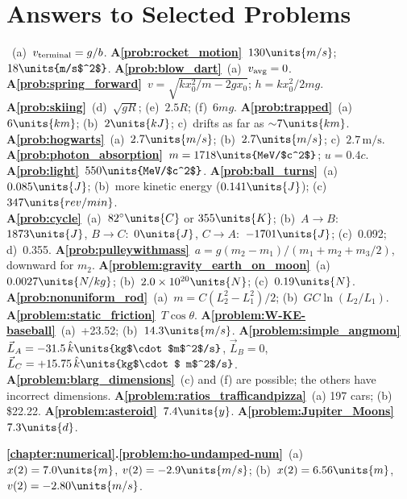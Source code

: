 \chapter*{Answers to Selected Problems}


~(a)~$v_{\rm terminal} = g/b$.  
{\bf A\ref{prob:rocket_motion}}~$130\units{m/s}$; $18\units{m/s$^2$}$. 
{\bf A\ref{prob:blow_dart}}~(a)~$v_{\rm avg} = 0$.
{\bf A\ref{prob:spring_forward}}~$v =\sqrt{kx_0^2/m - 2 gx_0}$; $h = kx_0^2/2mg$. 
{\bf A\ref{prob:skiing}}~(d)~$\sqrt{gR}$; (e)~$2.5R$; (f)~$6mg$.
{\bf A\ref{prob:trapped}}~(a)~$6\units{km}$; (b)~$2\units{kJ}$; c)~drifts 
as far as ${\sim}7\units{km}$. 
{\bf A\ref{prob:hogwarts}}~(a)~$2.7\units{m/s}$; (b)~$2.7\units{m/s}$; 
c)~$2.7\, \mbox{m/s}$.  
{\bf A\ref{prob:photon_absorption}}~$m = 1718\units{MeV/$c^2$}$; $u = 0.4c$.  
{\bf A\ref{prob:light}}~$550\units{MeV/$c^2$}$. 
{\bf A\ref{prob:ball_turns}}~(a)~$0.085\units{J}$; (b)~more kinetic energy 
($0.141\units{J}$); 
(c)~$347\units{rev/min}$.\\
 {\bf A\ref{prob:cycle}}~(a)~$82^\circ\units{C}$ or $355\units{K}$; 
(b)~$A\to B$:~$1873\units{J}$, $B\to C$:~$0\units{J}$, 
$C\to A$:~$-1701\units{J}$; (c)~0.092; d)~0.355.
{\bf A\ref{prob:pulleywithmass}}~$a = g(m_2-m_1)/(m_1+m_2+m_3/2)$, downward
for $m_2$.
{\bf A\ref{problem:gravity_earth_on_moon}}~(a)~$0.0027\units{N/kg}$; 
(b)~$2.0\times 10^{20}\units{N}$; (c)~$0.19\units{N}$.\\
{\bf A\ref{prob:nonuniform_rod}}~(a)~$m=C(L_2^2-L_1^2)/2$; (b)~$GC\ln(L_2/L_1)$.
{\bf A\ref{problem:static_friction}}~$T\cos\theta$.
{\bf A\ref{problem:W-KE-baseball}}~(a)~+23.52; (b)~$14.3\units{m/s}$.
{\bf A\ref{problem:simple_angmom}}~$\vec{L}_A = -31.5\, 
\hat{k}\units{kg$\cdot$m$^2$/s}$, $\vec{L}_B = 0$,
$\vec{L}_C = +15.75\, \hat{k}\units{kg$\cdot$ m$^2$/s}$.  
{\bf A\ref{problem:blarg_dimensions}}~(c) and (f) are possible; the others
have incorrect dimensions.
{\bf A\ref{problem:ratios_trafficandpizza}}~(a) 197 cars; (b) \$22.22.
{\bf A\ref{problem:asteroid}}~$7.4\units{y}$.
{\bf A\ref{problem:Jupiter_Moons}}~$7.3\units{d}$.
\medskip


\noindent 
{\bf \ref{chapter:numerical}.\ref{problem:ho-undamped-num}}~(a)~$x(2) 
= 7.0\units{m}$, $v(2)=-2.9\units{m/s}$; (b)~$x(2) = 6.56\units{m}$, 
$v(2)=-2.80\units{m/s}$.
\medskip

